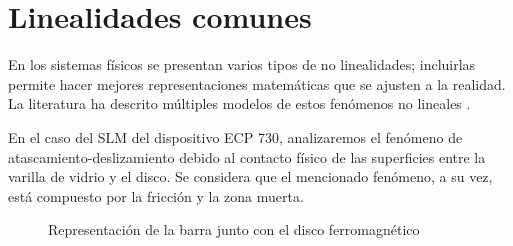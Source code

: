 \section*{Linealidades comunes}
En los sistemas físicos se presentan varios tipos de no linealidades; incluirlas permite hacer mejores representaciones matemáticas que se ajusten a la realidad. La literatura ha descrito múltiples modelos de estos fenómenos no lineales \cite{khalil2}\cite{jean}\cite{gene}\cite{ogata}.

En el caso del SLM del dispositivo ECP 730, analizaremos el fenómeno de atascamiento-deslizamiento debido al contacto físico de las superficies entre la varilla de vidrio y el disco. Se considera que el mencionado fenómeno, a su vez, está compuesto por la fricción y la zona muerta.

\begin{figure}
    \begin{center}
    \hspace{2cm}
    \end{center}
    \begin{center}
    \end{center}
    
    \vspace{-0.5cm}
    
    \begin{center}
    \end{center}
\caption{Representación de la barra junto con el disco ferromagnético}
\end{figure}



